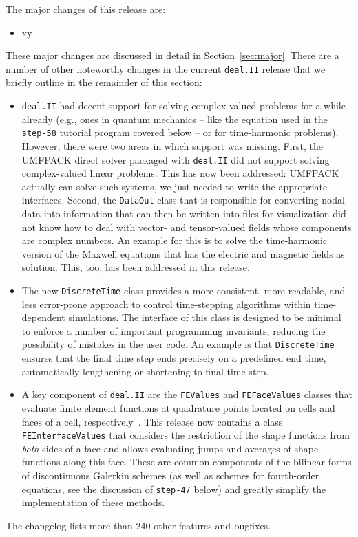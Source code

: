 \documentclass{ansarticle-preprint}
\newcommand{\specialword}[1]{\texttt{#1}}
\newcommand{\dealii}{{\specialword{deal.II}}\xspace}
\begin{document}
The major changes of this release are:
%
\begin{itemize}
\item xy 
\end{itemize}
%
These major changes are discussed in detail in Section~\ref{sec:major}. There
are a number of other noteworthy changes in the current \dealii{} release
that we briefly outline in the remainder of this section:
%
\begin{itemize}
\item \dealii{} had decent support for solving complex-valued problems
  for a while already
  (e.g., ones in quantum mechanics -- like the equation used in the
  \texttt{step-58} tutorial program covered below -- or for
  time-harmonic problems). However, there were two
  areas in which support was missing. First, the UMFPACK direct solver
  packaged with \dealii{} did not support solving complex-valued
  linear problems. This has now been addressed: UMFPACK actually can
  solve such systems, we just needed to write the appropriate
  interfaces. Second, the \texttt{DataOut} class that is responsible
  for converting nodal data into information that can then be written
  into files for visualization did not know how to deal with vector-
  and tensor-valued fields whose components are complex numbers. An
  example for this is to solve the time-harmonic version of the
  Maxwell equations that has the electric and magnetic fields as
  solution. This, too, has been addressed in this release.
\item The new \texttt{DiscreteTime} class provides a more
  consistent, more readable, and less error-prone approach to control
  time-stepping algorithms within time-dependent simulations.
  The interface of this class is designed to be minimal
  to enforce a number of important programming invariants, reducing
  the possibility of mistakes in the user code.
  An example is that \texttt{DiscreteTime} ensures that the final time step ends
  precisely on a predefined end time, automatically
  lengthening or shortening to final time step.
\item A key component of \dealii{} are the \texttt{FEValues} and
  \texttt{FEFaceValues} classes that evaluate finite element functions
  at quadrature points located on cells and faces of a cell,
  respectively~\cite{BangerthHartmannKanschat2007}. This release now
  contains a class \texttt{FEInterfaceValues} that considers the
  restriction of the shape functions from \textit{both} sides of a face and
  allows evaluating jumps and averages of shape functions along this
  face. These are common components of the bilinear forms of
  discontinuous Galerkin schemes (as well as schemes for fourth-order
  equations, see the discussion of \texttt{step-47} below) and greatly
  simplify the implementation of these methods.
\end{itemize}
%
The changelog lists more than 240 other
features and bugfixes.
\end{document}
